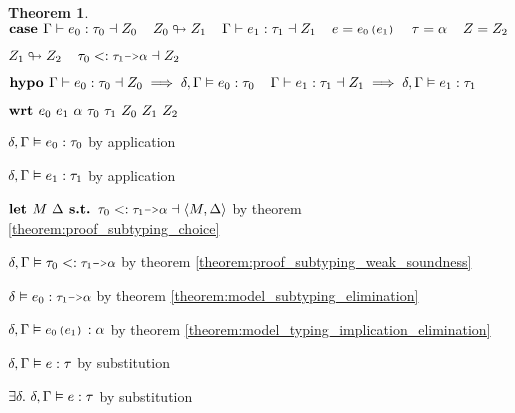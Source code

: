 \documentclass[acmsmall]{acmart}
\theoremstyle{definition}
\newtheorem{theorem}{Theorem}[section]
\begin{document}
\begin{theorem}
  \item \Z $\B{case } 
    \Gamma \entails e_0 \hastype \tau_0 \given Z_0
    \I
    Z_0 \looparrowright Z_1
    \I
    \Gamma \entails e_1 \hastype \tau_1 \given Z_1
    \I
    e = \J{$e_0$($e_1$)} 
    \I 
    \tau = \alpha 
    \I
    Z = Z_2
  $ 
  \item \Z $ 
    Z_1 \looparrowright Z_2
    \I
    \tau_0 \subtypes \J{$\tau_1$->$\alpha$} \given Z_2
  $ 
  \item \Z $\textbf{hypo } 
    \Gamma \vdash e_0 : \tau_0 \dashv Z_0
    \implies 
    \delta, \Gamma \vDash e_0 : \tau_0
    \hspace{4mm}
    \Gamma \vdash e_1 : \tau_1 \dashv Z_1
    \implies 
    \delta, \Gamma \vDash e_1 : \tau_1
  $ 
  \item \Z $\B{wrt } e_0\ e_1\ \alpha\ \tau_0\ \tau_1\ Z_0\ Z_1\ Z_2 $ 
    \item \Z\Z $
      \delta, \Gamma \vDash e_0 : \tau_0
    $ by application
    \item \Z\Z $
      \delta, \Gamma \vDash e_1 : \tau_1
    $ by application

    \item \Z\Z $
      \B{let } M\ \Delta
      \B{ s.t. }
      \tau_0 \subtypes \J{$\tau_1$->$\alpha$} \given \left<M, \Delta \right>
    $ by theorem \ref{theorem:proof_subtyping_choice} 
    \item \Z\Z $
      \delta, \Gamma \satisfies \tau_0 \subtypes \J{$\tau_1$->$\alpha$} 
    $ by theorem \ref{theorem:proof_subtyping_weak_soundness} 
    \item \Z\Z $
      \delta \satisfies e_0 \hastype \J{$\tau_1$->$\alpha$} 
    $ by theorem \ref{theorem:model_subtyping_elimination} 
    \item \Z\Z $
      \delta, \Gamma \satisfies \J{$e_0$($e_1$)} \hastype \alpha
    $ by theorem \ref{theorem:model_typing_implication_elimination} 
    \item \Z\Z $
      \delta, \Gamma \vDash e : \tau
    $ by substitution 
    \item \Z\Z $
      \exists \delta .\ \delta, \Gamma \vDash e : \tau
    $ by substitution 


\end{theorem}
\end{document}
